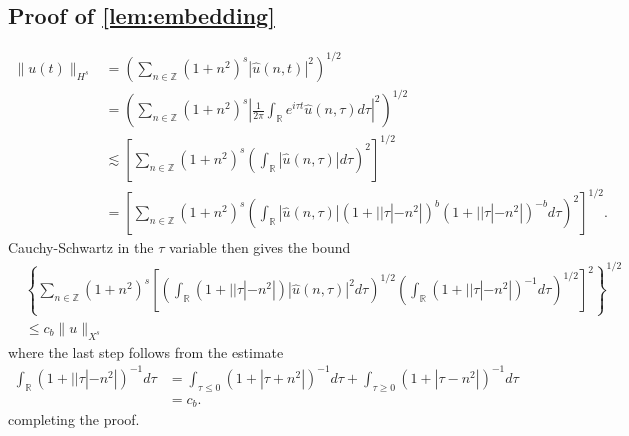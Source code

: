 \documentclass[12pt,reqno]{amsart}
\numberwithin{equation}{section}  %
\numberwithin{figure}{section}
\newcommand{\rr}{\mathbb{R}}
\newcommand{\zz}{\mathbb{Z}}
\newcommand{\wh}{\widehat}
\theoremstyle{plain}
\theoremstyle{definition}
\theoremstyle{remark}
\begin{document}
\subsection{Proof of \autoref{lem:embedding}} 
\label{ssec:embedding-pf}
%
%
\begin{equation*}
\begin{split}
  \| u(t) \|_{H^{s}}
  & = \left( \sum_{n \in \zz} (1 + n^{2})^{s} |
  \wh{u}(n, t) |^{2} \right)^{1/2}
  \\
  & = \left( \sum_{n \in \zz} (1 + n^{2})^{s} | \frac{1}{2\pi}
  \int_{\rr}e^{i \tau t} \wh{u}(n, \tau) d \tau |^{2} \right)^{1/2}
  \\
  & \lesssim \left[ \sum_{n \in \zz} (1 + n^{2})^{s} \left( \int_{\rr} |
  \wh{u}(n, \tau)
  | d \tau \right)^{2} \right]^{1/2}
  \\
  & = \left[ \sum_{n \in \zz} (1 + n^{2})^{s} \left( \int_{\rr} |
  \wh{u}(n, \tau)
  | (1 + | | \tau | - n^{2} |)^{b} (1 + | | \tau | - n^{2} |)^{-b} d \tau
  \right)^{2} \right]^{1/2}.
\end{split}
\end{equation*}
%
%
Cauchy-Schwartz in the $\tau$ variable then gives the bound
%
%
\begin{equation*}
\begin{split}
  & \left \{\sum_{n \in \zz} (1 + n^{2})^{s} \left[ \left( \int_{\rr} (1 + | |
  \tau | - n^{2}
  |) | \wh{u}(n, \tau) |^{2} d \tau  \right)^{1/2} 
 \left( \int_{\rr} (1 + | |
  \tau | - n^{2}
  |)^{-1}  d \tau  \right)^{1/2}
  \right]^{2}\right \}^{1/2}
  \\
  & \le c_{b} \| u \|_{X^{s}}
\end{split}
\end{equation*}
%
where the last step follows from the estimate
%
%
%
%
\begin{equation*}
\begin{split}
\int_{\rr} (1 + | |
  \tau | - n^{2}
  |)^{-1}  d \tau 
  & = \int_{\tau \le 0} (1 + 
  |\tau  + n^{2}
  |)^{-1}  d \tau  + \int_{\tau \ge 0} (1 + | 
  \tau - n^{2}
  |)^{-1}  d \tau
  \\
  & = c_{b}.
\end{split}
\end{equation*}
%
%
completing the proof. \qquad \qedsymbol
%
\end{document}

